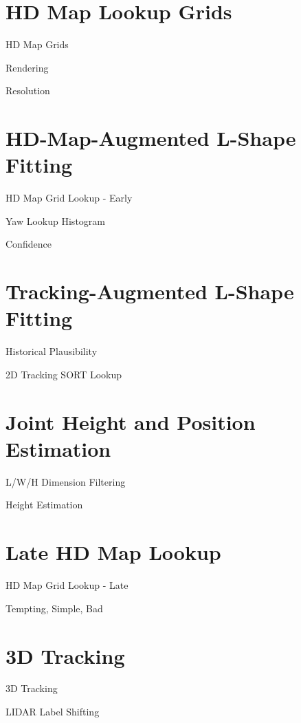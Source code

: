 
\section{HD Map Lookup Grids}
\label{sec:hdmapgrids}

HD Map Grids \par
Rendering \par
Resolution

\newpage

\newpage


\section{HD-Map-Augmented L-Shape Fitting}
\label{sec:hdmaplsf}

HD Map Grid Lookup - Early \par
Yaw Lookup Histogram \par
Confidence

\newpage


\section{Tracking-Augmented L-Shape Fitting}
\label{sec:trackinglsf}

Historical Plausibility \par
2D Tracking SORT Lookup

\newpage


\section{Joint Height and Position Estimation}
\label{sec:sizeandpos}

L/W/H Dimension Filtering \par
Height Estimation

\newpage


\section{Late HD Map Lookup}
\label{sec:hdmaplate}

HD Map Grid Lookup - Late \par
Tempting, Simple, Bad

\section{3D Tracking}
\label{sec:trackthreed}

3D Tracking \par
LIDAR Label Shifting
